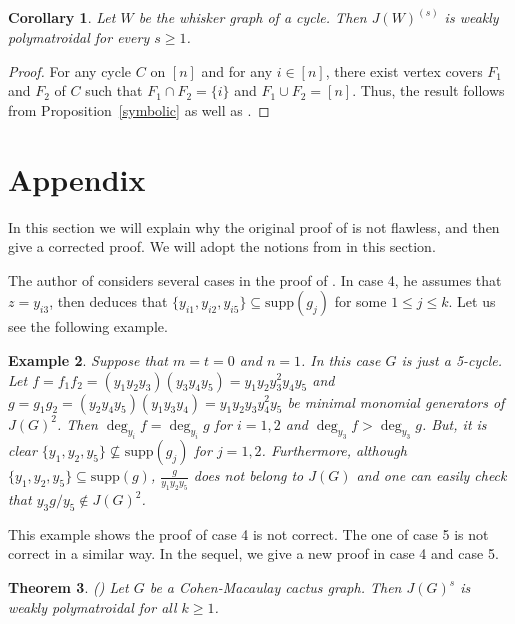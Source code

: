\documentclass[12pt]{amsart}
\newtheorem{Theorem}{Theorem}[section]
\newtheorem{Corollary}[Theorem]{Corollary}
\newtheorem{Example}[Theorem]{Example}
\begin{document}
\begin{Corollary} Let $W$ be the whisker graph of a cycle. Then $J(W)^{(s)}$ is weakly polymatroidal for every $s\geq 1$.
\end{Corollary}
\begin{proof} For any cycle $C$ on $[n]$ and for any $i\in [n]$, there exist vertex covers $F_1$ and $F_2$ of $C$ such that $F_1\cap F_2=\{i\}$ and $F_1\cup F_2=[n]$. Thus, the result follows from Proposition~\ref{symbolic} as well as \cite[Proposition 5.3]{HHT}.
\end{proof}

\section{Appendix}

In this section we will explain why the original proof of \cite[Theorem 4.3]{M} is not flawless,  and then give a corrected proof. We will adopt the notions from \cite{M} in this section.

 The author of \cite{M}  considers several cases in the  proof of  \cite[Theorem 4.3]{M}. In case 4,   he assumes that $z=y_{i3}$, then deduces that $\{y_{i1}, y_{i2}, y_{i5}\}\subseteq \mathrm{supp}(g_j)$ for some $1\leq j\leq k$. Let us see the following example.

\begin{Example}\em Suppose that $m=t=0$ and $n=1$.  In this case $G$ is just a 5-cycle. Let $f=f_1f_2=(y_1y_2y_3)(y_3y_4y_5)=y_1y_2y_3^2y_4y_5$ and $g=g_1g_2=( y_2y_4y_5)(y_1y_3y_4)=y_1y_2y_3y_4^2y_5$ be  minimal monomial generators of $J(G)^2$. Then $\deg_{y_i}f=\deg_{y_i}g$ for $i=1,2$ and $\deg_{y_3}f>\deg_{y_3}g$. But, it is clear $\{y_{1}, y_{2}, y_{5}\}\nsubseteq \mathrm{supp}(g_j)$ for $j=1,2$. Furthermore, although $\{y_{1}, y_{2}, y_{5}\}\subseteq \mathrm{supp}(g)$,   $\frac{g}{y_1y_2y_5}$ does not belong to $J(G)$ and one can easily check that $y_3g/y_5\notin J(G)^2$.
\end{Example}
This example shows the proof of case 4 is not correct. The one of case 5 is not correct in a similar way. In the sequel, we give a new proof in case 4 and case 5.



\begin{Theorem} {\em  (\cite[Theorem 4.3]{M})}  Let $G$ be a Cohen-Macaulay cactus graph. Then $J(G)^s$ is weakly polymatroidal for all $k\geq 1$.
\end{Theorem}
\end{document}
